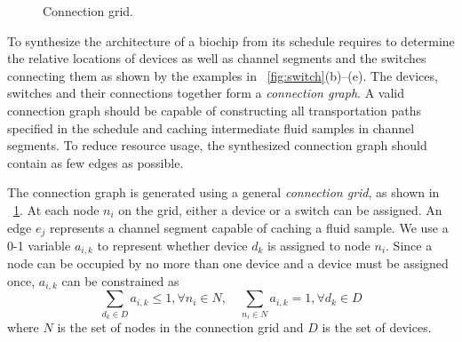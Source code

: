 \begin{figure}[t]
{\figurefontsize
\centering

\caption{Connection grid.}
\label{fig:grid_model}
}
\end{figure}

To synthesize the architecture of a biochip from its schedule requires to
determine the relative locations of devices
as well as channel segments and the switches connecting them as shown by the examples
in  \figname~\ref{fig:switch}(b)--(e). The devices, switches and their connections together form a
\textit{connection graph}. %
A valid connection graph should be capable of
constructing all transportation paths specified in the schedule and caching
intermediate fluid samples in channel segments.
To reduce resource usage, the synthesized connection graph
should contain as few edges as possible.

The connection graph is generated using a general \textit{connection grid}, as
shown in \figname~\ref{fig:grid_model}. At each node $n_i$ on the grid,
either a device or a switch can be assigned. An edge $e_j$ represents
a channel segment capable of caching a fluid sample.
%
%
We use a 0-1 variable $a_{i,k}$ to represent whether device $d_k$
is assigned to node $n_i$. Since a node can be occupied by no more than one device
and a device must be assigned once, $a_{i,k}$ can be constrained as
\begin{equation} \label{eq:device_node_1}
\sum_{d_k\in D} a_{i,k}\le 1, \forall n_i\in N, \quad
\sum_{n_i\in N} a_{i,k}=1, \forall d_k\in D
\end{equation}
where $N$ is the set of nodes in the connection grid and $D$ is the set of
devices.

